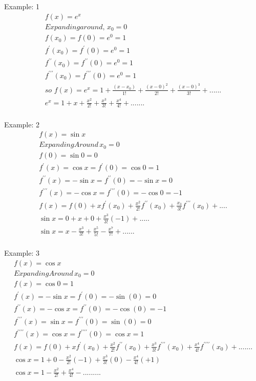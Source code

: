 Example: 1
\begin{align}
	f(x) = e^x \\
	Expanding around,\,  x_0 = 0  \\
	f(x_0) = f(0) = e^0=1 \\
	f^\prime(x_0)=f^\prime(0)=e^0=1 \\
	f^{\prime\prime}(x_0)=f^{\prime\prime}(0)=e^0=1 \\
	f^{\prime\prime\prime}(x_0)=f^{\prime\prime\prime}(0)=e^0=1 \\
	so \,\, f(x) = e^x=1+\frac{(x-x_0)}{1!}+\frac{(x-0)^2}{2!}+\frac{(x-0)^3}{3!}+...... \\
	e^x = 1 + x+\frac{x^2}{2!}+\frac{x^3}{3!}+\frac{x^4}{4!}+....... \\	
\end{align}
	
Example: 2
\begin{align}
	f(x) = \sin x \\
	Expanding Around \, x_0 = 0 \\
	f(0) = \sin 0 = 0 \\
	f^\prime(x)=\cos x =f^\prime(0)=\cos 0 = 1 \\
	f^{\prime\prime}(x)=-\sin x = f^{\prime\prime}(0)= -\sin x = 0 \\
	f^{\prime\prime\prime}(x)=-\cos x = f^{\prime\prime\prime}(0)=-\cos 0 = -1 \\
	f(x)=f(0)+xf^\prime(x_0)+\frac{x^2}{2!}f^{\prime\prime}(x_0)+\frac{x_3}{3!}f^{\prime\prime\prime}(x_0)+.... \\
	\sin x = 0+x+0+\frac{x^3}{3!}(-1)+..... \\
	\sin x = x-\frac{x^3}{3!}+\frac{x^5}{5!}-\frac{x^7}{7!}+...... \\
\end{align}


Example: 3
\begin{align}
	f(x)= \cos x \\
	Expanding Around \, x_0 = 0 \\
	f(x) = \cos 0 = 1 \\
	f^\prime(x) = -\sin x = f^\prime(0)=-\sin(0) = 0 \\
	f^{\prime\prime}(x) = - \cos x = f^{\prime\prime}(0)= -\cos(0) = -1 \\
	f^{\prime\prime\prime}(x)= \sin x = f^{\prime\prime\prime}(0)=\sin(0)= 0 \\
	f^{\prime\prime\prime\prime}(x)= \cos x = f^{\prime\prime\prime\prime}(0)=\cos x = 1 \\
	f(x) = f(0)+xf^\prime(x_0)+\frac{x^2}{2!}f^{\prime\prime}(x_0)+\frac{x^3}{3!}f^{\prime\prime\prime}(x_0)+\frac{x^4}{4!}
	f^{\prime\prime\prime\prime}(x_0)+....... \\
	\cos x = 1+0-\frac{x^2}{2!}(-1)+\frac{x^3}{3!}(0)-\frac{x^4}{4!}(+1)\\
	\cos x = 1-\frac{x^2}{2!}+\frac{x^4}{4!}-.........	
\end{align}


